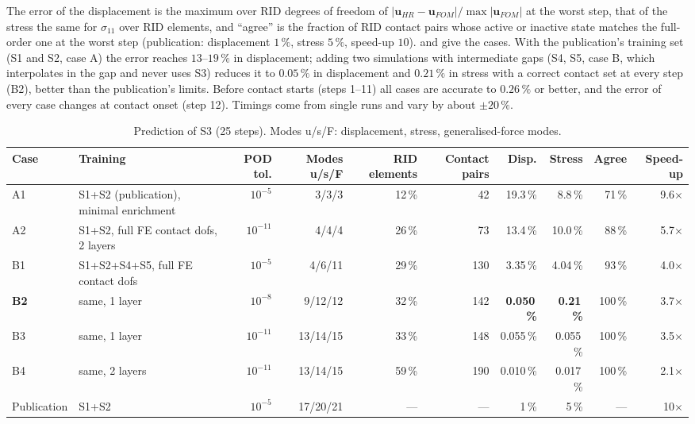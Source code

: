 The error of the displacement is the maximum over RID degrees of freedom of $|\mathbf u_{HR}-\mathbf u_{FOM}|/\max|\mathbf u_{FOM}|$ at the worst step, that of the stress the same for $\sigma_{11}$ over RID elements, and ``agree'' is the fraction of RID contact pairs whose active or inactive state matches the full-order one at the worst step (publication: displacement $1\,\%$, stress $5\,\%$, speed-up $10$).  and  give the cases. With the publication's training set (S1 and S2, case A) the error reaches $13$--$19\,\%$ in displacement; adding two simulations with intermediate gaps (S4, S5, case B, which interpolates in the gap and never uses S3) reduces it to $0.05\,\%$ in displacement and $0.21\,\%$ in stress with a correct contact set at every step (B2), better than the publication's limits. Before contact starts (steps 1--11) all cases are accurate to $0.26\,\%$ or better, and the error of every case changes at contact onset (step 12). Timings come from single runs and vary by about $\pm20\,\%$.

\begin{table}[tbp]
\centering\footnotesize
\setlength{\tabcolsep}{3pt}
\caption{Prediction of S3 (25 steps). Modes u/s/F: displacement, stress, generalised-force modes.}\label{tab:vf-hb3-cases}
\begin{tabular}{@{}llrrrrrrrr@{}}
\toprule
Case & Training & POD tol. & Modes u/s/F & RID elements & Contact pairs & Disp. & Stress & Agree & Speed-up\\
\midrule
A1 & S1+S2 (publication), minimal enrichment & $10^{-5}$ & 3/3/3 & 12\,\% & 42 & 19.3\,\% & 8.8\,\% & 71\,\% & 9.6$\times$\\
A2 & S1+S2, full FE contact dofs, 2 layers & $10^{-11}$ & 4/4/4 & 26\,\% & 73 & 13.4\,\% & 10.0\,\% & 88\,\% & 5.7$\times$\\
B1 & S1+S2+S4+S5, full FE contact dofs & $10^{-5}$ & 4/6/11 & 29\,\% & 130 & 3.35\,\% & 4.04\,\% & 93\,\% & 4.0$\times$\\
\textbf{B2} & same, 1 layer & $10^{-8}$ & 9/12/12 & 32\,\% & 142 & \textbf{0.050\,\%} & \textbf{0.21\,\%} & 100\,\% & 3.7$\times$\\
B3 & same, 1 layer & $10^{-11}$ & 13/14/15 & 33\,\% & 148 & 0.055\,\% & 0.055\,\% & 100\,\% & 3.5$\times$\\
B4 & same, 2 layers & $10^{-11}$ & 13/14/15 & 59\,\% & 190 & 0.010\,\% & 0.017\,\% & 100\,\% & 2.1$\times$\\
Publication & S1+S2 & $10^{-5}$ & 17/20/21 & --- & --- & 1\,\% & 5\,\% & --- & 10$\times$\\
\bottomrule
\end{tabular}
\end{table}

